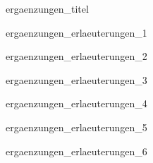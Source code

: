 \begin{tcolorbox}[colframe=SGL2,coltitle=white,colback=white,title={}]
	{ergaenzungen_titel}
\end{tcolorbox}
\cppb\cleardoublepage
\begin{tcolorbox}[colframe=SGL2,coltitle=white,title={}]
	{ergaenzungen_erlaeuterungen_1}
\end{tcolorbox}
\cppb
\begin{tcolorbox}[colframe=SGL2,coltitle=white,title={}]
	{ergaenzungen_erlaeuterungen_2}
\end{tcolorbox}
\cppb
\begin{tcolorbox}[colframe=white,coltitle=white,title={}]
	{ergaenzungen_erlaeuterungen_3}
\end{tcolorbox}
\cppb
\begin{tcolorbox}[colframe=white,coltitle=white,title={}]
	{ergaenzungen_erlaeuterungen_4}
\end{tcolorbox}
\cppb
\begin{tcolorbox}[colframe=white,coltitle=white,title={}]
	{ergaenzungen_erlaeuterungen_5}
\end{tcolorbox}
\cppb
\begin{tcolorbox}[colframe=white,coltitle=white,title={}]
	{ergaenzungen_erlaeuterungen_6}
\end{tcolorbox}
